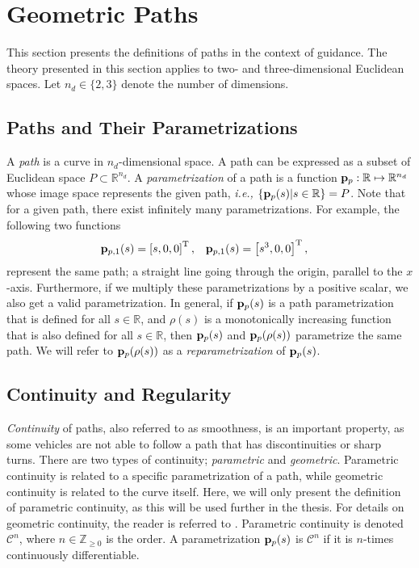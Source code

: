 \section{Geometric Paths}
\label{sec:background_paths}

This section presents the definitions of paths in the context of guidance.
The theory presented in this section applies to two- and three-dimensional Euclidean spaces.
Let $n_d \in \{2,3\}$ denote the number of dimensions.

\subsection{Paths and Their Parametrizations}
A \emph{path} is a curve in $n_d$-dimensional space.
A path can be expressed as a subset of Euclidean space $P \subset \mathbb{R}^{n_d}$.
A \emph{parametrization} of a path is a function $\mathbf{p}_p : \mathbb{R} \mapsto \mathbb{R}^{n_d}$ whose image space represents the given path, \emph{i.e.,} $\{\mathbf{p}_p(s) | s \in \mathbb{R}\} = P$.
Note that for a given path, there exist infinitely many parametrizations.
For example, the following two functions
\begin{align}
    \mathbf{p}_{p, 1}(s) &= \left[s, 0, 0\right]^{\mathrm{T}}, &
    \mathbf{p}_{p, 1}(s) &= \left[s^3, 0, 0\right]^{\mathrm{T}},
    \label{eq:background_path_example}
\end{align}
represent the same path; a straight line going through the origin, parallel to the $x$-axis.
Furthermore, if we multiply these parametrizations by a positive scalar, we also get a valid parametrization.
In general, if $\mathbf{p}_p(s)$ is a path parametrization that is defined for all $s \in \mathbb{R}$, and $\rho(s)$ is a monotonically increasing function that is also defined for all $s \in \mathbb{R}$, then $\mathbf{p}_p(s)$ and $\mathbf{p}_p(\rho(s))$ parametrize the same path.
We will refer to $\mathbf{p}_p(\rho(s))$ as a \emph{reparametrization} of $\mathbf{p}_p(s)$.

\subsection{Continuity and Regularity}
\emph{Continuity} of paths, also referred to as smoothness, is an important property, as some vehicles are not able to follow a path that has discontinuities or sharp turns.
There are two types of continuity; \emph{parametric} and \emph{geometric}.
Parametric continuity is related to a specific parametrization of a path, while geometric continuity is related to the curve itself.
Here, we will only present the definition of parametric continuity, as this will be used further in the thesis.
For details on geometric continuity, the reader is referred to \cite{barsky_geometric_1984}.
Parametric continuity is denoted $\mathcal{C}^n$, where $n \in \mathbb{Z}_{\geq 0}$ is the order.
A parametrization $\mathbf{p}_p(s)$ is $\mathcal{C}^n$ if it is $n$-times continuously differentiable.


